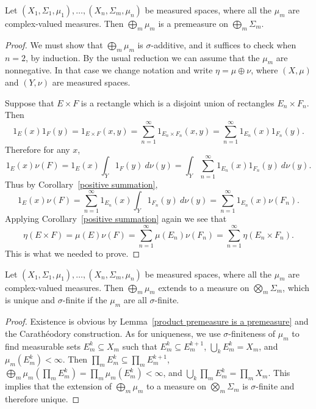 \begin{lemma}\label{product premeasure is a premeasure}
Let $(X_{1}, \Sigma_{1}, \mu_{1}), \dots, (X_{n}, \Sigma_{m}, \mu_{n})$ be measured spaces, where all the $\mu_{m}$ are complex-valued measures.
Then $\bigoplus_{m} \mu_{m}$ is a premeasure on $\bigoplus_{m} \Sigma_{m}$.
\end{lemma}
\begin{proof}
We must show that $\bigoplus_{m} \mu_{m}$ is $\sigma$-additive, and it suffices to check when $n = 2$, by induction.
By the usual reduction we can assume that the $\mu_{m}$ are nonnegative.
In that case we change notation and write $\eta = \mu \oplus \nu$, where $(X, \mu)$ and $(Y, \nu)$ are measured spaces.

Suppose that $E \times F$ is a rectangle which is a disjoint union of rectangles $E_{n} \times F_{n}$.
Then
\[1_{E}(x) 1_{F}(y) = 1_{E \times F}(x, y) = \sum_{n=1}^{\infty} 1_{E_{n} \times F_{n}}(x, y) = \sum_{n=1}^{\infty} 1_{E_{n}}(x) 1_{F_{n}}(y).\]
Therefore for any $x$,
\[1_{E}(x) \nu(F) = 1_{E}(x) \int_{Y} 1_{F}(y)~d\nu(y) = \int_{Y} \sum_{n=1}^{\infty} 1_{E_{n}}(x) 1_{F_{n}}(y) ~d\nu(y).\]
Thus by Corollary~\ref{positive summation},
\[1_{E}(x) \nu(F) = \sum_{n=1}^{\infty} 1_{E_{n}}(x) \int_{Y} 1_{F_{n}}(y)~d\nu(y) = \sum_{n=1}^{\infty} 1_{E_{n}}(x)\nu(F_{n}).\]
Applying Corollary~\ref{positive summation} again we see that
\[\eta(E \times F) = \mu(E) \nu(F) = \sum_{n=1}^{\infty} \mu(E_{n}) \nu(F_{n}) = \sum_{n=1}^{\infty} \eta(E_{n} \times F_{n}).\]
This is what we needed to prove.
\end{proof}

\begin{corollary}
Let $(X_{1}, \Sigma_{1}, \mu_{1}), \dots, (X_{n}, \Sigma_{m}, \mu_{n})$ be measured spaces, where all the $\mu_{m}$ are complex-valued measures.
Then $\bigoplus_{m} \mu_{m}$ extends to a measure on $\bigotimes_{m} \Sigma_{m}$, which is unique and $\sigma$-finite if the $\mu_{m}$ are all $\sigma$-finite.
\end{corollary}
\begin{proof}
Existence is obvious by Lemma~\ref{product premeasure is a premeasure} and the Carathéodory construction.
As for uniqueness, we use $\sigma$-finiteness of $\mu_{m}$ to find measurable sets $E_{m}^{k} \subseteq X_{m}$ such that $E_{m}^{k} \subseteq E_{m}^{k+1}$, $\bigcup_{k} E_{m}^{k} = X_{m}$, and $\mu_{m}(E_{m}^{k}) < \infty$.
Then $\prod_{m} E_{m}^{k} \subseteq \prod_{m} E_{m}^{k+1}$, $\bigoplus_{m} \mu_{m}(\prod_{m} E_{m}^{k}) = \prod_{m} \mu_{m}(E_{m}^{k}) < \infty$, and $\bigcup_{k} \prod_{m} E_{m}^{k} = \prod_{m} X_{m}$.
This implies that the extension of $\bigoplus_{m} \mu_{m}$ to a measure on $\bigotimes_{m} \Sigma_{m}$ is $\sigma$-finite and therefore unique.
\end{proof}

